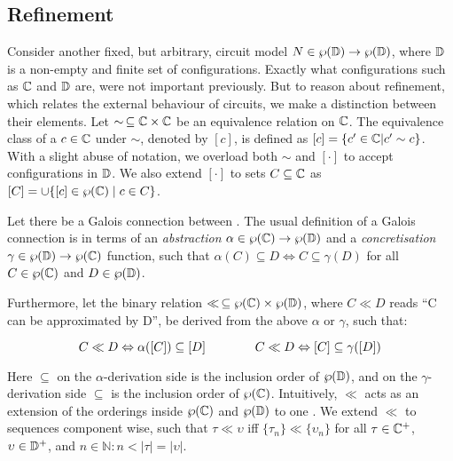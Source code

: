 \subsection{Refinement}

Consider another fixed, but arbitrary, circuit model $N \in \wp(\mathbb{D}) \rightarrow \wp(\mathbb{D})$, where $\mathbb{D}$ is a non-empty and finite set of configurations. Exactly what configurations such as $\mathbb{C}$ and $\mathbb{D}$ are, were not important previously. But to reason about refinement, which relates the external behaviour of circuits, we make a distinction between their elements. Let $\sim \, \subseteq \mathbb{C} \times \mathbb{C}$ be an equivalence relation on $\mathbb{C}$. The equivalence class of a $c \in \mathbb{C}$ under $\sim$, denoted by $[c]$, is defined as $[c] = \{ c' \in \mathbb{C} | c' \sim c \}$. With a slight abuse of notation, we overload both $\sim$ and $[\cdot]$ to accept configurations in $\mathbb{D}$. We also extend $[\cdot]$ to sets $C \subseteq \mathbb{C}$ as $[C] = \cup\{[c] \in \wp(\mathbb{C}) \mid c \in C \}$.


Let there be a Galois connection between . The usual definition of a Galois connection is in terms of an \textit{abstraction} $\alpha \in \wp(\mathbb{C}) \rightarrow \wp(\mathbb{D})$ and a \textit{concretisation} $\gamma \in \wp(\mathbb{D}) \rightarrow \wp(\mathbb{C})$ function, such that $\alpha(C) \subseteq D \iff C \subseteq \gamma(D)$ for all $C \in \wp(\mathbb{C})$ and $D \in \wp(\mathbb{D})$. 

Furthermore, let the binary relation $\ll \, \subseteq \wp(\mathbb{C}) \times \wp(\mathbb{D})$, where $C \ll D$ reads ``C can be approximated by D'', be derived from the above $\alpha$ or $\gamma$, such that:

\begin{equation*}
C \ll D \Leftrightarrow \alpha([C]) \subseteq [D] \quad\quad\quad\quad C \ll D \Leftrightarrow [C] \subseteq \gamma([D])
\end{equation*}

\noindent Here $\subseteq$ on the $\alpha$-derivation side is the inclusion order of $\wp(\mathbb{D})$, and on the $\gamma$-derivation side $\subseteq$ is the inclusion order of $\wp(\mathbb{C})$. Intuitively, $\ll$ acts as an extension of the orderings inside $\wp(\mathbb{C})$ and $\wp(\mathbb{D})$ to one .  We extend $\ll$ to sequences component wise, such that $\tau \ll \upsilon$ iff $\{ \tau_{n} \} \ll \{ \upsilon_{n} \}$ for all $\tau \in \mathbb{C}^{+}$, $\upsilon \in \mathbb{D}^{+}$, and $n \in \mathbb{N} : n < | \tau | = | \upsilon |$.

